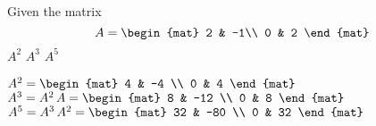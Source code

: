 
\begin{Exercise}[
name={},
title={}, 
difficulty=0,
origin={\cite{CR}}]
Given the matrix
\[
	A = \begin{mat} 2 & -1\\ 0 & 2 \end{mat}
\]
	\Question $A^2$
	\Question $A^3$
	\Question $A^5$ 
	\EndCurrentQuestion
\end{Exercise}

\begin{Answer}
	\Question $A^2 =  \begin{mat} 4 & -4 \\ 0 & 4 \end{mat}$
	\Question $A^3 = A^2 \, A   =  \begin{mat} 8 & -12 \\ 0 & 8 \end{mat}$
	\Question $A^5 = A^3 \, A^2 =  \begin{mat} 32 & -80 \\ 0 & 32 \end{mat}$
\end{Answer}
